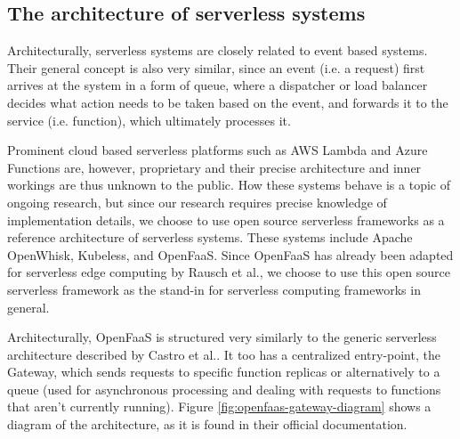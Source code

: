 \subsection{The architecture of serverless systems}
Architecturally, serverless systems are closely related to event based systems.
Their general concept is also very similar, since an event (i.e. a request) first arrives at the system in a form of queue, where a dispatcher or load balancer decides what action needs to be taken based on the event, and forwards it to the service (i.e. function), which ultimately processes it\cite{castroServerDeadLong2019}.

Prominent cloud based serverless platforms such as AWS Lambda\cite{aws-lambda} and Azure Functions\cite{azure-functions} are, however, proprietary and their precise architecture and inner workings are thus unknown to the public.
How these systems behave is a topic of ongoing research\cite{wangPeekingCurtainsServerless2018}, but since our research requires precise knowledge of implementation details, we choose to use open source serverless frameworks as a reference architecture of serverless systems.
These systems include Apache OpenWhisk\cite{openwhisk}, Kubeless\cite{kubeless}, and OpenFaaS\cite{openfaas}.
Since OpenFaaS has already been adapted for serverless edge computing by Rausch et al.\cite{rauschServerlessPlatformEdge}, we choose to use this open source serverless framework as the stand-in for serverless computing frameworks in general.

Architecturally, OpenFaaS is structured very similarly to the generic serverless architecture described by Castro et al.\cite{castroServerDeadLong2019}.
It too has a centralized entry-point, the Gateway, which sends requests to specific function replicas or alternatively to a queue (used for asynchronous processing and dealing with requests to functions that aren't currently running).
Figure \ref{fig:openfaas-gateway-diagram} shows a diagram of the architecture, as it is found in their official documentation\cite{openfaas-gateway}.

